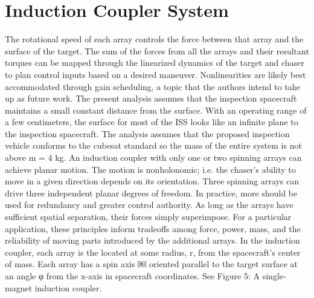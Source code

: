 \section{Induction Coupler System}

The rotational speed of each array controls the force between that array and the surface of the target. The sum of the forces from all the arrays and their resultant torques can be mapped through the linearized dynamics of the target and chaser to plan control inputs based on a desired maneuver. Nonlinearities are likely best accommodated through gain scheduling, a topic that the authors intend to take up as future work.
The present analysis assumes that the inspection spacecraft maintains a small constant distance from the surface. With an operating range of a few centimeters, the surface for most of the ISS looks like an infinite plane to the inspection spacecraft. The analysis assumes that the proposed inspection vehicle conforms to the cubesat standard so the mass of the entire system is not above m = 4 kg.
An induction coupler with only one or two spinning arrays can achieve planar motion. The motion is nonholonomic; i.e. the chaser’s ability to move in a given direction depends on its orientation.
Three spinning arrays can drive three independent planar degrees of freedom. In practice, more should be used for redundancy and greater control authority. As long as the arrays have sufficient spatial separation, their forces simply superimpose. For a particular application, these principles inform tradeoffs among force, power, mass, and the reliability of moving parts introduced by the additional arrays.
In the induction coupler, each array is the located at some radius, r, from the spacecraft's center of mass. Each array has a spin axis ￼ oriented parallel to the target surface at an angle φ‎ from the x-axis in spacecraft coordinates. See Figure 5: A single-magnet induction coupler.